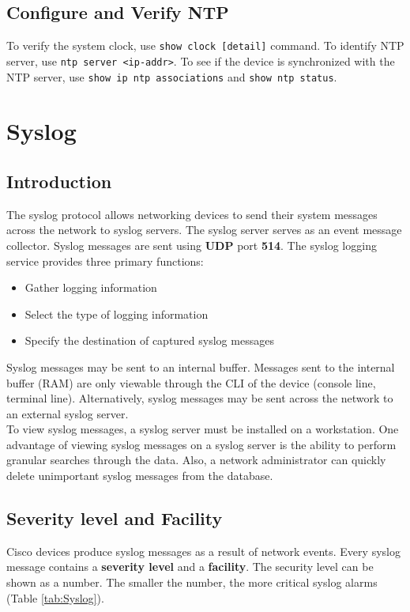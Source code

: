 \subsection{Configure and Verify NTP}

To verify the system clock, use \verb|show clock [detail]| command. To identify NTP server, use \verb|ntp server <ip-addr>|. To see if the device is synchronized with the NTP server, use \verb|show ip ntp associations| and \verb|show ntp status|.

\section{Syslog}

\subsection{Introduction}

The syslog protocol allows networking devices to send their system messages across the network to syslog servers. The syslog server serves as an event message collector. Syslog messages are sent using \textbf{UDP} port \textbf{514}. The syslog logging service provides three primary functions:

\begin{itemize}
\item Gather logging information
\item Select the type of logging information
\item Specify the destination of captured syslog messages
\end{itemize}

Syslog messages may be sent to an internal buffer. Messages sent to the internal buffer (RAM) are only viewable through the CLI of the device (console line, terminal line). Alternatively, syslog messages may be sent across the network to an external syslog server.\\

To view syslog messages, a syslog server must be installed on a workstation. One advantage of viewing syslog messages on a syslog server is the ability to perform granular searches through the data. Also, a network administrator can quickly delete unimportant syslog messages from the database.

\subsection{Severity level and Facility}
Cisco devices produce syslog messages as a result of network events. Every syslog message contains a \textbf{severity level} and a \textbf{facility}. The security level can be shown as a number. The smaller the number, the more critical syslog alarms (Table \ref{tab:Syslog}).\\

